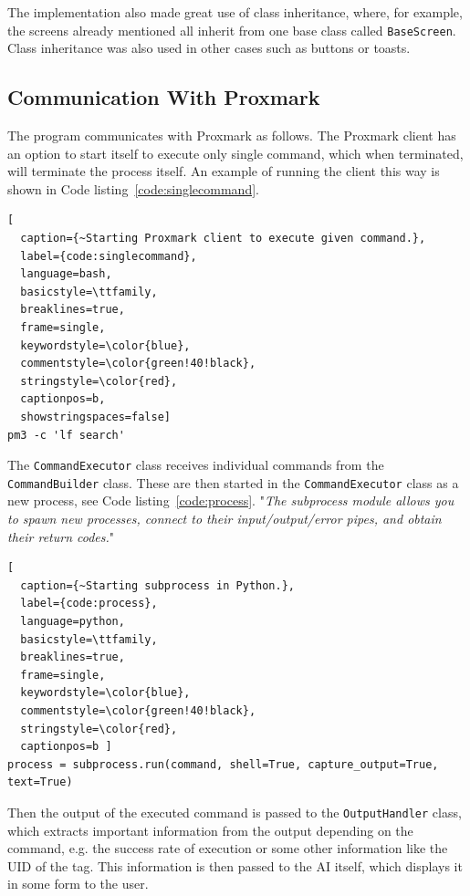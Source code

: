The implementation also made great use of class inheritance, where, for example, the screens already mentioned all inherit from one base class called \texttt{BaseScreen}. Class inheritance was also used in other cases such as buttons or toasts.


\subsection{Communication With Proxmark}

The program communicates with Proxmark as follows. The Proxmark client has an option to start itself to execute only single command, which when terminated, will terminate the process itself. An example of running the client this way is shown in Code listing~\ref{code:singlecommand}.

\begin{lstlisting}[
  caption={~Starting Proxmark client to execute given command.},
  label={code:singlecommand},
  language=bash,
  basicstyle=\ttfamily,
  breaklines=true,
  frame=single, 
  keywordstyle=\color{blue},
  commentstyle=\color{green!40!black}, 
  stringstyle=\color{red},
  captionpos=b,
  showstringspaces=false]
pm3 -c 'lf search'
\end{lstlisting}

The \texttt{CommandExecutor} class receives individual commands from the \texttt{CommandBuilder} class. These are then started in the \texttt{CommandExecutor} class as a new process, see Code listing~\ref{code:process}. "\textit{The subprocess module allows you to spawn new processes, connect to their input/output/error pipes, and obtain their return codes.}"~\cite{pythonsubprocess}



\begin{lstlisting}[
  caption={~Starting subprocess in Python.},
  label={code:process},
  language=python,
  basicstyle=\ttfamily,
  breaklines=true,
  frame=single, 
  keywordstyle=\color{blue},
  commentstyle=\color{green!40!black}, 
  stringstyle=\color{red},
  captionpos=b ]
process = subprocess.run(command, shell=True, capture_output=True, text=True)
\end{lstlisting}

Then the output of the executed command is passed to the \texttt{OutputHandler} class, which extracts important information from the output depending on the command, e.g. the success rate of execution or some other information like the UID of the tag. This information is then passed to the AI itself, which displays it in some form to the user.

